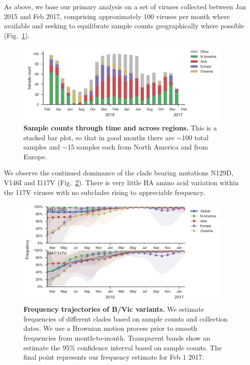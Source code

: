 \documentclass[11pt,oneside,letterpaper]{article}
\begin{document}
As above, we base our primary analysis on a set of viruses collected between Jan 2015 and Feb 2017, comprising approximately 100 viruses per month where available and seeking to equilibrate sample counts geographically where possible (Fig.\ \ref{Vic_counts}).

\begin{figure}[H]
	\centering
	\includegraphics[width=0.95\textwidth]{../figures/feb-2017/Vic_counts.png}
	\caption{\textbf{Sample counts through time and across regions.}
	This is a stacked bar plot, so that in good months there are $\sim$100 total samples and $\sim$15 samples each from North America and from Europe.
	}
	\label{Vic_counts}
\end{figure}

\pagebreak

We observe the continued dominance of the clade bearing mutations N129D, V146I and I117V (Fig.\ \ref{Vic_mutations}).
There is very little HA amino acid variation within the 117V viruses with no subclades rising to appreciable frequency.

\begin{figure}[H]
	\centering
	\includegraphics[width=0.95\textwidth]{../figures/feb-2017/Vic_mutations.png}
	\caption{\textbf{Frequency trajectories of B/Vic variants.}
	We estimate frequencies of different clades based on sample counts and collection dates.
	We use a Brownian motion process prior to smooth frequencies from month-to-month.
	Transparent bands show an estimate the 95\% confidence interval based on sample counts.
	The final point represents our frequency estimate for Feb 1 2017.
	}
	\label{Vic_mutations}
\end{figure}
\end{document}
